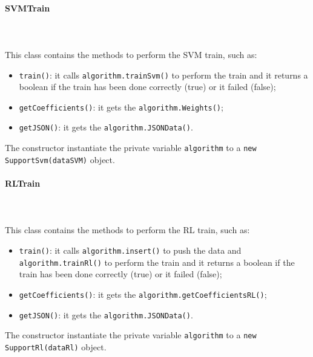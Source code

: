 \paragraph*{SVMTrain}\mbox{} \\ \mbox{} \\
This class contains the methods to perform the SVM train, such as: \begin{itemize}
\item \texttt{train()}: it calls \texttt{algorithm.trainSvm()} to perform the train and it returns a boolean if the train has been done correctly (true) or it failed (false);
\item \texttt{getCoefficients()}: it gets the \texttt{algorithm.Weights()};
\item \texttt{getJSON()}: it gets the \texttt{algorithm.JSONData()}.
\end{itemize}
The constructor instantiate the private variable \texttt{algorithm} to a \texttt{new SupportSvm(dataSVM)} object.

\paragraph*{RLTrain}\mbox{} \\ \mbox{} \\
This class contains the methods to perform the RL train, such as: \begin{itemize}
\item \texttt{train()}: it calls \texttt{algorithm.insert()} to push the data and  \texttt{algorithm.trainRl()} to perform the train and it returns a boolean if the train has been done correctly (true) or it failed (false);
\item \texttt{getCoefficients()}: it gets the \texttt{algorithm.getCoefficientsRL()};
\item \texttt{getJSON()}: it gets the \texttt{algorithm.JSONData()}.
\end{itemize}
The constructor instantiate the private variable \texttt{algorithm} to a \texttt{new SupportRl(dataRl)} object.

